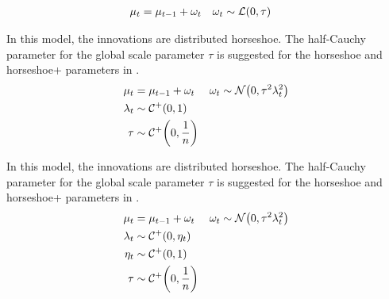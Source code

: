 \begin{description}[font = \normalfont\ModelII]
\begin{equation}
    \begin{aligned}[t]
      \mu_{t} &= \mu_{t - 1} + \omega_{t} & \omega_{t} & \sim \mathcal{L}\mathopen{}\left(0, \tau\right)\mathclose{}
    \end{aligned}
  \end{equation}
\item[Horseshoe] In this model, the innovations are distributed horseshoe.
  The half-Cauchy parameter for the global scale parameter $\tau$ is suggested for the horseshoe and horseshoe+ parameters in \textcite{BhadraDattaPolsonEtAl2015a}.
  \begin{equation}
    \label{dlm:eq:19}
    \begin{aligned}[t]
      \mu_{t} &= \mu_{t - 1} + \omega_{t} & \omega_{t} & \sim \mathcal{N}\mathopen{}\left(0, \tau^{2} \lambda^{2}_{t}\right)\mathclose{} \\
      \lambda_{t} &\sim \mathcal{C^+}\mathopen{}\left(0, 1\right)\mathclose{} \\
      \tau &\sim \mathcal{C^+}\mathopen{}\left(0, \frac{1}{n}\right)\mathclose{}
    \end{aligned}
  \end{equation}
\item[Horseshoe+] In this model, the innovations are distributed horseshoe.
  The half-Cauchy parameter for the global scale parameter $\tau$ is suggested for the horseshoe and horseshoe+ parameters in \textcite{BhadraDattaPolsonEtAl2015a}.
  \begin{equation}
    \label{dlm:eq:23}
    \begin{aligned}[t]
      \mu_{t} &= \mu_{t - 1} + \omega_{t} & \omega_{t} & \sim \mathcal{N}\mathopen{}\left(0, \tau^{2} \lambda^{2}_{t}\right)\mathclose{} \\
      \lambda_{t} &\sim \mathcal{C^+}\mathopen{}\left(0, \eta_{t}\right)\mathclose{} \\
      \eta_{t} &\sim \mathcal{C^+}\mathopen{}\left(0, 1\right)\mathclose{} \\
      \tau &\sim \mathcal{C^+}\mathopen{}\left(0, \frac{1}{n}\right)\mathclose{}
    \end{aligned}
  \end{equation}
\end{description}


